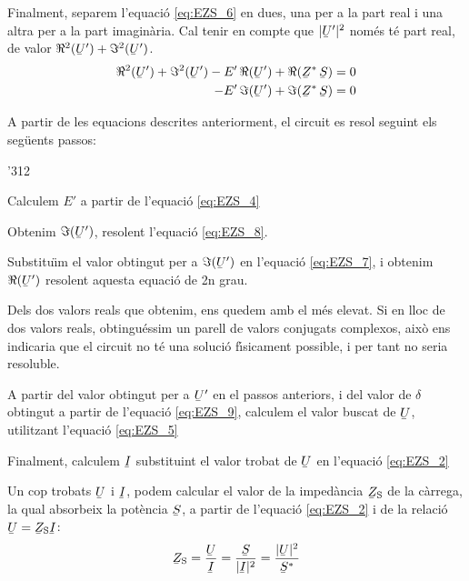 Finalment, separem l'equaci\'{o} \eqref{eq:EZS_6} en dues, una per a la part real i una altra per a la part imagin\`{a}ria. Cal tenir en compte que $|\cmplx{U}'|^2$ nom\'{e}s t\'{e} part real, de valor $\Re^2(\cmplx{U}') + \Im^2(\cmplx{U}')$.
\begin{align}
   \Re^2(\cmplx{U}') + \Im^2(\cmplx{U}') - E' \, \Re(\cmplx{U}') + \Re(\cmplx{Z}^* \, \cmplx{S}) &= 0 \label{eq:EZS_7} \\
   - E' \, \Im(\cmplx{U}') + \Im(\cmplx{Z}^* \, \cmplx{S}) &= 0 \label{eq:EZS_8}
\end{align}

A partir de les equacions descrites anteriorment, el circuit es resol seguint els seg\"{u}ents passos:
\begin{dingautolist}{'312}
   \item Calculem $E'$ a partir de l'equaci\'{o} \eqref{eq:EZS_4}
   \item Obtenim $\Im(\cmplx{U}')$, resolent l'equaci\'{o} \eqref{eq:EZS_8}.
   \item Substitu\"{\i}m el valor obtingut per a $\Im(\cmplx{U}')$ en l'equaci\'{o} \eqref{eq:EZS_7}, i obtenim $\Re(\cmplx{U}')$ resolent aquesta equaci\'{o} de 2n grau.
   \item Dels dos valors reals que obtenim, ens quedem amb el m\'{e}s elevat. Si en lloc de dos valors reals, obtingu\'{e}ssim un parell de valors conjugats complexos, aix\`{o} ens indicaria que el circuit no t\'{e} una soluci\'{o} f\'{\i}sicament possible, i per tant no seria resoluble.
   \item A partir del valor  obtingut per a $\cmplx{U}'$ en el passos anteriors, i del valor de $\delta$ obtingut a partir de l'equaci\'{o} \eqref{eq:EZS_9}, calculem el valor buscat de $\cmplx{U}$, utilitzant l'equaci\'{o} \eqref{eq:EZS_5}
   \item Finalment, calculem $\cmplx{I}$ substituint el valor trobat de $\cmplx{U}$ en l'equaci\'{o} \eqref{eq:EZS_2}
\end{dingautolist}

Un cop trobats $\cmplx{U}$ i $\cmplx{I}$, podem calcular el valor de
la imped\`{a}ncia  $\cmplx{Z}\ped{S}$ de la c\`{a}rrega, la qual absorbeix
la pot\`{e}ncia $\cmplx{S}$, a partir de l'equaci\'{o} \eqref{eq:EZS_2} i de
la relaci\'{o} $\cmplx{U} = \cmplx{Z}\ped{S} \cmplx{I}$:
\begin{equation}
   \cmplx{Z}\ped{S} = \frac{\cmplx{U}}{\cmplx{I}} =
   \frac{\cmplx{S}}{|\cmplx{I}|^2} =
   \frac{|\cmplx{U}|^2}{\cmplx{S}^*} \label{eq:EZS 10}
\end{equation}


